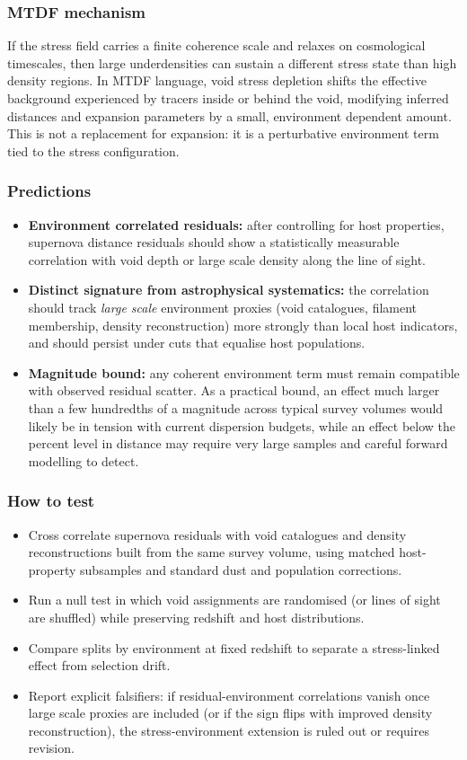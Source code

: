 \documentclass[11pt,a4paper]{article}
\begin{document}
\subsubsection{MTDF mechanism}
If the stress field carries a finite coherence scale and relaxes on cosmological timescales, then large underdensities can sustain a different stress state 
than high density regions. In MTDF language, void stress depletion shifts the effective background experienced by tracers inside or behind the void, 
modifying inferred distances and expansion parameters by a small, environment dependent amount. This is not a replacement for expansion: it is a perturbative 
environment term tied to the stress configuration.

\subsubsection{Predictions}
\begin{itemize}
  \item \textbf{Environment correlated residuals:} after controlling for host properties, supernova distance residuals should show a statistically measurable correlation with void depth or large scale density along the line of sight.
  \item \textbf{Distinct signature from astrophysical systematics:} the correlation should track \emph{large scale} environment proxies (void catalogues, filament membership, density reconstruction) more strongly than local host indicators, and should persist under cuts that equalise host populations.
  \item \textbf{Magnitude bound:} any coherent environment term must remain compatible with observed residual scatter. As a practical bound, an effect much larger than a few hundredths of a magnitude across typical survey volumes would likely be in tension with current dispersion budgets, while an effect below the percent level in distance may require very large samples and careful forward modelling to detect.
\end{itemize}

\subsubsection{How to test}
\begin{itemize}
  \item Cross correlate supernova residuals with void catalogues and density reconstructions built from the same survey volume, using matched host-property subsamples and standard dust and population corrections.
  \item Run a null test in which void assignments are randomised (or lines of sight are shuffled) while preserving redshift and host distributions.
  \item Compare splits by environment at fixed redshift to separate a stress-linked effect from selection drift.
  \item Report explicit falsifiers: if residual-environment correlations vanish once large scale proxies are included (or if the sign flips with improved density reconstruction), the stress-environment extension is ruled out or requires revision.
\end{itemize}
\end{document}
